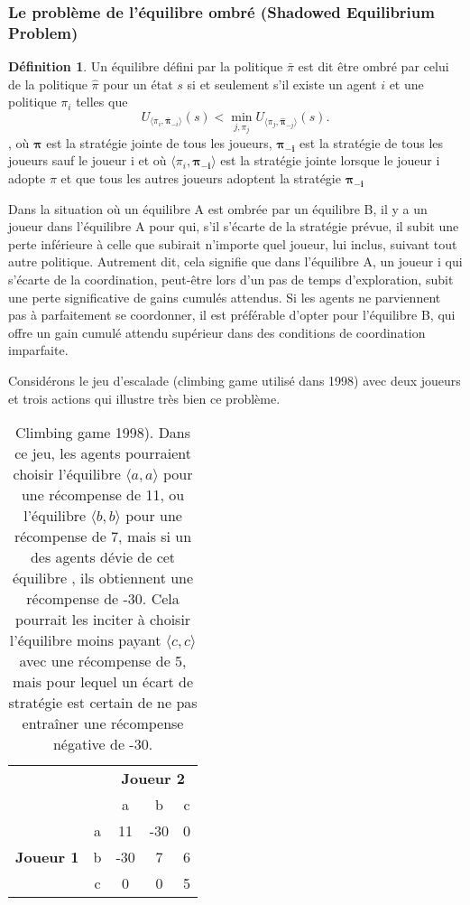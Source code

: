 \documentclass{article}
\theoremstyle{definition}
\newtheorem{definition}{Définition}
\begin{document}
\subsubsection{Le problème de l'équilibre ombré (Shadowed Equilibrium Problem)}
\begin{definition}
Un équilibre défini par la politique \(\bar{\pi}\) est dit être ombré par celui de la politique \(\hat{\pi}\) pour un état \(s\) si et seulement s'il existe un agent \(i\) et une politique \(\pi_{i}\) telles que
\[
U_{\langle \pi_{i}, \mathbf{\bar{\pi}}_{-i} \rangle}(s) < \min_{j,\pi_{j}} U_{\langle \pi_{j}, \mathbf{\hat{\pi}}_{-j} \rangle}(s).
\], où $\mathbf{\pi}$ est la stratégie jointe de tous les joueurs, $\mathbf{\pi_{-i}}$ est la stratégie de tous les joueurs sauf le joueur i et où $\langle \pi_{i}, \mathbf{\pi_{-i}} \rangle $ est la stratégie jointe lorsque le joueur i adopte $\pi$ et que tous les autres joueurs adoptent la stratégie $\mathbf{\pi_{-i}}$
\end{definition}
Dans la situation où un équilibre A est ombrée par un équilibre B, il y a un joueur dans l'équilibre A pour qui, s'il s'écarte de la stratégie prévue, il subit une perte inférieure à celle que subirait n'importe quel joueur, lui inclus, suivant tout autre politique. Autrement dit, cela signifie que dans l'équilibre A, un joueur i qui s'écarte de la coordination, peut-être lors d'un pas de temps d'exploration, subit une perte significative de gains cumulés attendus. Si les agents ne parviennent pas à parfaitement se coordonner, il est préférable d'opter pour l'équilibre B, qui offre un gain cumulé attendu supérieur dans des conditions de coordination imparfaite. 

Considérons le jeu d'escalade (climbing game utilisé dans \citet{claus_dynamics_nodate} 1998) avec deux joueurs et trois actions qui illustre très bien ce problème.


\begin{table}[H]
\centering
\begin{tabular}{c|cccc}
  & & \multicolumn{3}{c}{\textbf{Joueur 2}} \\ 
  & & a & b & c \\
\hline
\multirow{3}{*}{\textbf{Joueur 1}} 
  & a & 11 & -30 & 0 \\
  & b & -30 & 7 & 6 \\
  & c & 0 & 0 & 5 \\
\end{tabular}
\caption{Climbing game \citet{claus_dynamics_nodate} 1998). Dans ce jeu, les agents pourraient choisir l'équilibre $\langle a,a \rangle$ pour une récompense de 11, ou l'équilibre $\langle b,b \rangle$ pour une récompense de 7, mais si un des agents dévie de cet équilibre , ils obtiennent une récompense de -30. Cela pourrait les inciter à choisir l'équilibre moins payant $\langle c,c \rangle$ avec une récompense de 5, mais pour lequel un écart de stratégie est certain de ne pas entraîner une récompense négative de -30.}
\end{table}
\end{document}

